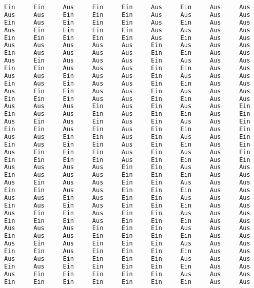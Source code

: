 \documentclass[a4paper,10pt,ngerman]{scrartcl}
\begin{document}
\begin{lstlisting}[language=C++]
Ein     Ein     Aus     Ein     Ein     Aus     Ein     Aus     Aus     Ein     Ein
Aus     Aus     Ein     Ein     Ein     Aus     Aus     Aus     Aus     Ein     Ein
Ein     Aus     Ein     Ein     Ein     Aus     Ein     Aus     Aus     Ein     Ein
Aus     Ein     Ein     Ein     Ein     Aus     Aus     Aus     Aus     Ein     Ein
Ein     Ein     Ein     Ein     Ein     Aus     Ein     Aus     Aus     Ein     Ein
Aus     Aus     Aus     Aus     Aus     Ein     Aus     Aus     Aus     Ein     Aus
Ein     Aus     Aus     Aus     Aus     Ein     Ein     Aus     Aus     Ein     Aus
Aus     Ein     Aus     Aus     Aus     Ein     Aus     Aus     Aus     Ein     Aus
Ein     Ein     Aus     Aus     Aus     Ein     Ein     Aus     Aus     Ein     Aus
Aus     Aus     Ein     Aus     Aus     Ein     Aus     Aus     Aus     Ein     Aus
Ein     Aus     Ein     Aus     Aus     Ein     Ein     Aus     Aus     Ein     Aus
Aus     Ein     Ein     Aus     Aus     Ein     Aus     Aus     Aus     Ein     Aus
Ein     Ein     Ein     Aus     Aus     Ein     Ein     Aus     Aus     Ein     Aus
Aus     Aus     Aus     Ein     Aus     Ein     Aus     Aus     Ein     Aus     Aus
Ein     Aus     Aus     Ein     Aus     Ein     Ein     Aus     Ein     Aus     Aus
Aus     Ein     Aus     Ein     Aus     Ein     Aus     Aus     Ein     Aus     Aus
Ein     Ein     Aus     Ein     Aus     Ein     Ein     Aus     Ein     Aus     Aus
Aus     Aus     Ein     Ein     Aus     Ein     Aus     Aus     Ein     Aus     Aus
Ein     Aus     Ein     Ein     Aus     Ein     Ein     Aus     Ein     Aus     Aus
Aus     Ein     Ein     Ein     Aus     Ein     Aus     Aus     Ein     Aus     Aus
Ein     Ein     Ein     Ein     Aus     Ein     Ein     Aus     Ein     Aus     Aus
Aus     Aus     Aus     Aus     Ein     Ein     Aus     Aus     Aus     Ein     Ein
Ein     Aus     Aus     Aus     Ein     Ein     Ein     Aus     Aus     Ein     Ein
Aus     Ein     Aus     Aus     Ein     Ein     Aus     Aus     Aus     Ein     Ein
Ein     Ein     Aus     Aus     Ein     Ein     Ein     Aus     Aus     Ein     Ein
Aus     Aus     Ein     Aus     Ein     Ein     Aus     Aus     Aus     Ein     Ein
Ein     Aus     Ein     Aus     Ein     Ein     Ein     Aus     Aus     Ein     Ein
Aus     Ein     Ein     Aus     Ein     Ein     Aus     Aus     Aus     Ein     Ein
Ein     Ein     Ein     Aus     Ein     Ein     Ein     Aus     Aus     Ein     Ein
Aus     Aus     Aus     Ein     Ein     Ein     Aus     Aus     Aus     Ein     Ein
Ein     Aus     Aus     Ein     Ein     Ein     Ein     Aus     Aus     Ein     Ein
Aus     Ein     Aus     Ein     Ein     Ein     Aus     Aus     Aus     Ein     Ein
Ein     Ein     Aus     Ein     Ein     Ein     Ein     Aus     Aus     Ein     Ein
Aus     Aus     Ein     Ein     Ein     Ein     Aus     Aus     Aus     Ein     Ein
Ein     Aus     Ein     Ein     Ein     Ein     Ein     Aus     Aus     Ein     Ein
Aus     Ein     Ein     Ein     Ein     Ein     Aus     Aus     Aus     Ein     Ein
Ein     Ein     Ein     Ein     Ein     Ein     Ein     Aus     Aus     Ein     Ein
\end{lstlisting}
\pagebreak
\end{document}
